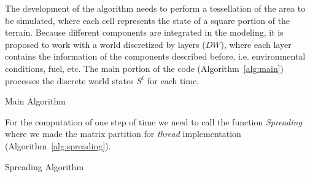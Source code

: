 \documentclass[conference]{IEEEtran}
\begin{document}
        The development of the algorithm needs to perform a tessellation of the area to be simulated, where each cell represents 
        the state of a square portion of the terrain. Because different components are integrated in the modeling, it is proposed 
        to work with a world discretized by layers ($DW$), where each layer contains the information of the components described before,
        i.e. environmental conditions, fuel, etc. The main portion of the code (Algorithm~\ref{alg:main}) processes the discrete world 
        states $S^t$ for each time.
        
        \begin{algorithm}[!ht]
            \begin{algorithmic}
                \EndFor
            \end{algorithmic}
            \caption{Main Algorithm}
            \label{alg:main}
        \end{algorithm}
        
        For the computation of one step of time we need to call the function \emph{Spreading} where we made the matrix partition
        for \emph{thread} implementation (Algorithm~\ref{alg:spreading}).
        
        \begin{algorithm}[!ht]
            \begin{algorithmic}
                        \Else
                        \EndIf
                    \EndFor
                    \EndFor
                \EndProcedure
            \end{algorithmic}
            \caption{Spreading Algorithm}
            \label{alg:spreading}
        \end{algorithm}
        
\end{document}
